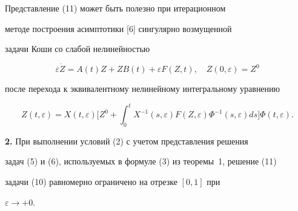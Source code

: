  


\begin{cornonum} 


Представление (11) может быть полезно при итерационном 


методе построения асимптотики [6] сингулярно возмущенной 


задачи Коши со слабой нелинейностью 


$$ 


\varepsilon\Dot Z=A(t)Z+ZB(t)+\varepsilon F(Z,t),\quad 


Z(0,\varepsilon)=Z^0 


$$ 


после перехода к эквивалентному нелинейному интегральному уравнению 


$$ 


Z(t,\varepsilon)=X(t,\varepsilon)\bigg[Z^0+\int^t_0 


X^{-1}(s,\varepsilon)F(Z,\varepsilon)\Phi^{-1}(s,\varepsilon) 


ds\bigg]\Phi(t,\varepsilon). 


$$ 


\end{cornonum} 


 


{\bf 2.} При выполнении условий (2) с учетом представления решения 


задач (5) и (6), используемых в формуле (3) из теоремы~1, решение (11) 


задачи (10) равномерно ограничено на отрезке $[0,1]$ при 


$\varepsilon\to+0$. 


 


 


